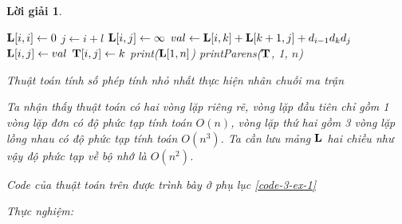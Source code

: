 \documentclass[14pt, a4paper]{article}
\theoremstyle{sltheorem}
\theoremstyle{soltheorem}
\newtheorem*{loigiai}{Lời giải}
\begin{document}
\begin{loigiai}
\begin{itemize} [label={$-$}]
        \begin{algorithm}
            \DontPrintSemicolon
    
             {
                $\bold{L} \lbrack i, i \rbrack \gets 0$\;
            }
             {
                 {
                    $j \gets i + l$\;
                    $\bold{L} \lbrack i, j \rbrack \gets \infty$\;
                     {
                        $val \gets \bold{L} \lbrack i, k \rbrack + \bold{L} \lbrack k + 1, j \rbrack + d_{i-1} d_{k} d_{j}$\;
                         {
                            $\bold{L} \lbrack i, j \rbrack \gets val$\;
                            $\bold{T} \lbrack i, j \rbrack \gets k$
                        }
                    }
                }
            }
            print($\bold{L} \lbrack 1, n \rbrack$)\;
            printParens($\bold{T}$, 1, $n$)\;
            \caption{Thuật toán tính số phép tính nhỏ nhất thực hiện nhân chuỗi ma trận}
        \end{algorithm}
    
        Ta nhận thấy thuật toán có hai vòng lặp riêng rẽ, vòng lặp đầu tiên chỉ gồm 1 vòng lặp đơn có độ phức tạp tính toán $O(n)$,
        vòng lặp thứ hai gồm 3 vòng lặp lồng nhau có độ phức tạp tính toán $O(n^3)$. Ta cần lưu mảng $\bold{L}$ hai chiều như vậy độ phức tạp về bộ nhớ là $O(n^2)$.

        Code của thuật toán trên được trình bày ở phụ lục \ref{code-3-ex-1}

        Thực nghiệm:


\end{itemize}
\end{loigiai}
\end{document}

